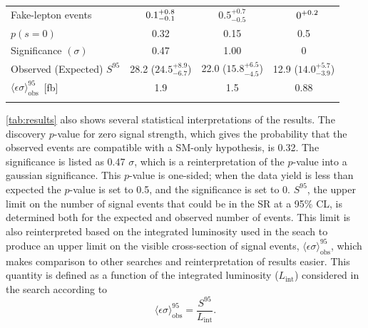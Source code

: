 \begin{table}
\begin{center}
\begin{tabular*}{\textwidth}{@{\extracolsep{\fill}}lccc}
 Fake-lepton events                                                         & $\makebox[3ex]{\hfill 0.1}_{-0.1}^{+0.8}$   & $0.5_{-0.5}^{+0.7}$ &   $\makebox[3ex]{\hfill 0}^{+0.2}$    \\
 \noalign{\smallskip}\hline\noalign{\smallskip}
$p(s=0)$                                                                    & 0.32      & 0.15        & 0.5        \\
Significance $(\sigma)$                                                               & 0.47                     & 1.00                   & 0           \\
Observed (Expected) $S^{95}$                                                & 28.2 ($24.5_{-6.7}^{+8.9}$) & 22.0 ($15.8_{-4.5}^{+6.5}$) & 12.9 ($14.0_{-3.9}^{+5.7}$) \\
$\langle\epsilon\sigma\rangle^{95}_\text{obs}$~[fb]                         & 1.9             & 1.5                    & 0.88   \\
 \noalign{\smallskip}\hline\noalign{\smallskip}
\end{tabular*}
\end{center}
\label{tab:results}
\end{table}

\autoref{tab:results} also shows several statistical interpretations of the results. The discovery $p$-value for zero signal strength, which gives the probability that the observed events are compatible with a \ac{SM}-only hypothesis, is 0.32. The significance is listed as 0.47 $\sigma$, which is a reinterpretation of the $p$-value into a gaussian significance. This $p$-value is one-sided; when the data yield is less than expected the $p$-value is set to 0.5, and the significance is set to 0. $S^{95}$, the upper limit on the number of signal events that could be in the \ac{SR} at a 95\% \ac{CL}, is determined both for the expected and observed number of events. This limit is also reinterpreted based on the integrated luminosity used in the seach to produce an upper limit on the visible cross-section of signal events, $\langle\epsilon\sigma\rangle^{95}_\text{obs}$, which makes comparison to other searches and reinterpretation of results easier. This quantity is defined as a function of the integrated luminosity ($L_\text{int}$) considered in the search according to
%
\begin{equation}
\langle\epsilon\sigma\rangle^{95}_\text{obs} = \frac{S^{95}}{L_\text{int}} . 
\end{equation}

